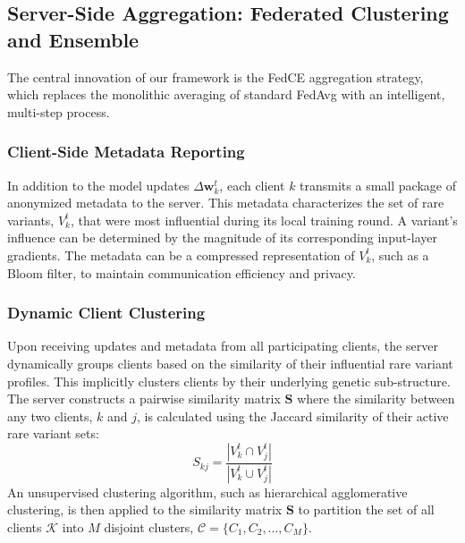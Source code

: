 \documentclass[conference]{IEEEtran}
\begin{document}
\subsection{Server-Side Aggregation: Federated Clustering and Ensemble}
\label{ssec:server_side}
The central innovation of our framework is the FedCE aggregation strategy, which replaces the monolithic averaging of standard FedAvg with an intelligent, multi-step process.

\subsubsection{Client-Side Metadata Reporting}
In addition to the model updates $\Delta\mathbf{w}_k^t$, each client $k$ transmits a small package of anonymized metadata to the server. This metadata characterizes the set of rare variants, $V_k^t$, that were most influential during its local training round. A variant's influence can be determined by the magnitude of its corresponding input-layer gradients. The metadata can be a compressed representation of $V_k^t$, such as a Bloom filter, to maintain communication efficiency and privacy.

\subsubsection{Dynamic Client Clustering}
Upon receiving updates and metadata from all participating clients, the server dynamically groups clients based on the similarity of their influential rare variant profiles. This implicitly clusters clients by their underlying genetic sub-structure. The server constructs a pairwise similarity matrix $\mathbf{S}$ where the similarity between any two clients, $k$ and $j$, is calculated using the Jaccard similarity of their active rare variant sets:
\begin{equation}
    S_{kj} = \frac{|V_k^t \cap V_j^t|}{|V_k^t \cup V_j^t|}
\end{equation}
An unsupervised clustering algorithm, such as hierarchical agglomerative clustering, is then applied to the similarity matrix $\mathbf{S}$ to partition the set of all clients $\mathcal{K}$ into $M$ disjoint clusters, $\mathcal{C} = \{C_1, C_2, \dots, C_M\}$.
\end{document}
